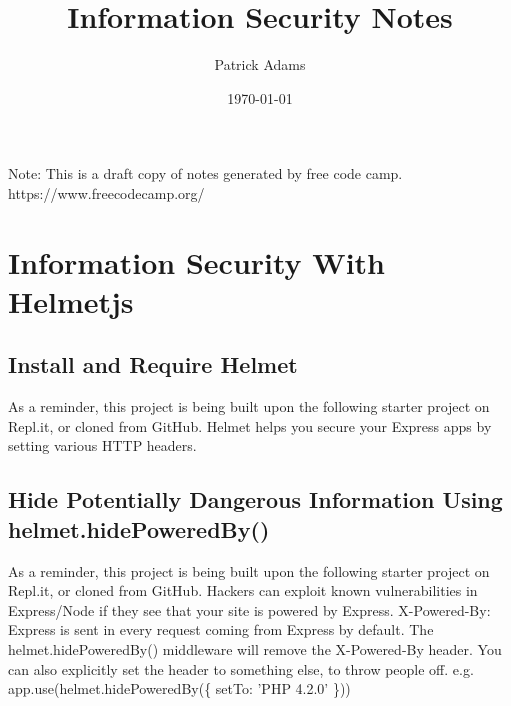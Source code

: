 \documentclass{article}%
\title{Information Security Notes}%
\author{Patrick Adams}%
\date{\today}%
\begin{document}
%
\normalsize%
\maketitle%
\newpage%
Note: This is a draft copy of notes generated by free code camp.\newline%
%
https://www.freecodecamp.org/%
\newpage%
\tableofcontents%
\section{Information Security With Helmetjs}%
\label{sec:InformationSecurityWithHelmetjs}%
\subsection{Install and Require Helmet}%
\label{subsec:InstallandRequireHelmet}%
As a reminder, this project is being built upon the following starter project on Repl.it, or cloned from GitHub.\newline%
Helmet helps you secure your Express apps by setting various HTTP headers.\newline%

%
\subsection{Hide Potentially Dangerous Information Using helmet.hidePoweredBy()}%
\label{subsec:HidePotentiallyDangerousInformationUsinghelmet.hidePoweredBy()}%
As a reminder, this project is being built upon the following starter project on Repl.it, or cloned from GitHub.\newline%
Hackers can exploit known vulnerabilities in Express/Node if they see that your site is powered by Express. X{-}Powered{-}By: Express is sent in every request coming from Express by default. The helmet.hidePoweredBy() middleware will remove the X{-}Powered{-}By header. You can also explicitly set the header to something else, to throw people off. e.g. app.use(helmet.hidePoweredBy(\{ setTo: 'PHP 4.2.0' \}))\newline%

%
\end{document}
